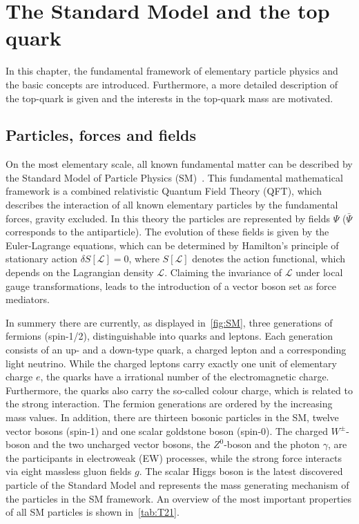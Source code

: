 \chapter{The Standard Model and the top quark}
\label{sec:SM1}
In this chapter, the fundamental framework of elementary particle physics and the basic concepts are introduced. Furthermore, a more detailed  description of the top-quark is given and the interests in the top-quark mass are motivated.  

\section{Particles, forces and fields}\label{key:SM 2}


\clearpage


On the most elementary scale, all known fundamental matter can be described by the Standard Model of Particle Physics (SM)~\cite{Glashow:1961tr,Glashow:1970gm,Gross:1973ju,Politzer:1973fx,Politzer:1974fr,Salam:1964ry,Weinberg:1967tq}. This fundamental mathematical framework is a combined relativistic Quantum Field Theory (QFT), which describes the interaction of all known elementary particles by the fundamental forces, gravity excluded.
In this theory the particles are represented by fields $\Psi$ ($\bar{\Psi}$  corresponds to the antiparticle). The evolution of these fields is given by the Euler-Lagrange equations, which can be determined by Hamilton's principle of stationary action $\delta S[\mathscr{L}] \!= 0 $, where $S[\mathscr{L}] $ denotes the action functional, which depends on the Lagrangian density $\mathscr{L} $. Claiming the invariance of
$\mathscr{L}$ under local gauge transformations, leads to the introduction of a  vector boson set as force mediators.

 In summery there are currently, as displayed in~\cref{fig:SM}, three generations of fermions (spin-1/2), distinguishable into quarks and leptons. Each generation consists of an up- and a down-type quark, a charged lepton and a corresponding light neutrino. While the charged leptons carry exactly one unit of elementary charge $e$, the quarks have  a irrational number of the electromagnetic charge. Furthermore, the quarks also carry the so-called colour charge, which is related to the strong interaction. The fermion generations are ordered by the increasing mass values.
In addition, there are thirteen bosonic particles in the SM, twelve vector bosons (spin-1) and one scalar goldstone boson (spin-0).
 The charged $W^{\pm}$-boson and the two uncharged vector bosons, the $Z^0$-boson and the photon $ \gamma$, are the participants in electroweak (EW) processes, while the strong force interacts via eight massless gluon fields $g$. The scalar Higgs boson is the latest discovered particle of the Standard Model and represents the mass generating mechanism of the particles in the SM framework. An overview of the most important properties of all SM particles is shown in~\cref{tab:T21}. 
 

